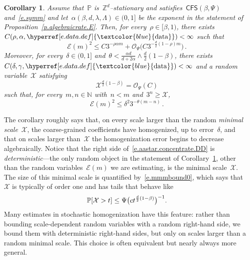\documentclass[11pt,twoside]{article} %
\numberwithin{equation}{section}
\newtheorem{corollary}[theorem]{Corollary}
\theoremstyle{definition}
\newcommand{\dataref}{\hyperref[e.data.def]{\textcolor{blue}{\ensuremath{\mathrm{data}}}}}
\let\originalleft\left
\let\originalright\right
\renewcommand{\left}{\mathopen{}\mathclose\bgroup\originalleft}
\renewcommand{\right}{\aftergroup\egroup\originalright}
\newcommand*{\N}{\ensuremath{\mathbb{N}}}
\newcommand*{\Zd}{\ensuremath{\mathbb{Z}^d}}
\renewcommand{\P}{\mathbb{P}}
\newcommand{\X}{\mathcal{X}}
\renewcommand{\O}{\mathcal{O}}
\newcommand{\CFS}{\mathsf{CFS}}
\begin{document}
\begin{corollary}
\label{c.subadd.converge}
Assume that~$\P$ is~$\Zd$--stationary and satisfies~$\CFS(\beta,\Psi)$ and~\eqref{e.symm} and let~$\alpha(\beta,d,\lambda,\Lambda) \in (0,1]$ be the exponent in the statement of Proposition~\ref{p.algebraicrate.E}. 
Then, for every~$\rho \in [\beta , 1)$, there exists~$C(\rho,\alpha,\dataref)<\infty$ such that 
\begin{equation}
\label{e.Em.summedout}
\mathcal{E}(m)^2
\leq 
C3^{-\rho \alpha m } + \O_\Psi\bigl( C 3^{-\frac d2(1-\rho)  m} \bigr) \,.
\end{equation}
Moreover, for every~$\delta\in (0,1]$ and~$\theta < \frac{\alpha d}{d+2\alpha} \wedge \frac d2(1-\beta)$, there exists~$C(\delta,\gamma,\dataref)<\infty$ and a random variable~$\X$ satisfying 
\begin{equation}
\label{e.mmmbound0}
\X^{\frac d2 (1-\beta)}
= \O_\Psi(C)
\end{equation}
such that, for every~$m,n\in\N$ with~$n<m$ and~$3^n\geq \X$, 
\begin{equation} 
\label{e.aastar.concentrate.DD}
\mathcal{E}(m)^2
\leq \delta^2 3^{-\theta(m-n)}
\,.
\end{equation}
\end{corollary}

The corollary roughly says that, on every scale larger than the random \emph{minimal scale}~$\X$, the coarse-grained coefficients have homogenized, up to error~$\delta$, and that on scales larger than~$\X$ the homogenization error begins to decrease algebraically. Notice that the right side of~\eqref{e.aastar.concentrate.DD} is \emph{deterministic}---the only random object in the statement of Corollary~\ref{c.subadd.converge}, other than the random variables~$\mathcal{E}(m)$ we are estimating, is the minimal scale~$\X$. 
The size of this minimal scale is quantified by~\eqref{e.mmmbound0}, which says that~$\X$ is typically of order one and has tails that behave like 
\begin{equation*}
\P \left[ \X > t \right] 
\leq 
\Psi\bigl( ct^{\frac d2(1-\beta)} \bigr)^{-1}. 
\end{equation*}
Many estimates in stochastic homogenization have this feature: rather than bounding scale-dependent random variables with a random right-hand side, we bound them with deterministic right-hand sides, but only on scales larger than a random minimal scale. This choice is often equivalent but nearly always more general. 

\smallskip
\end{document}
